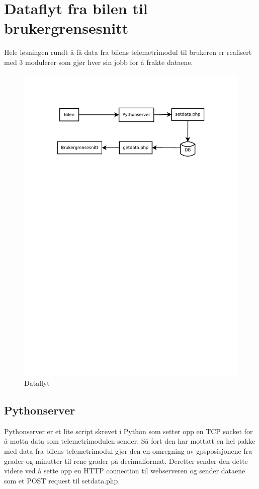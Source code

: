 \section{Dataflyt fra bilen til brukergrensesnitt}
Hele løsningen rundt å få data fra bilens telemetrimodul til brukeren er realisert med 3 modulerer som gjør hver sin jobb for å frakte dataene.
\begin{figure}[H]
\caption{Dataflyt} 
\label{dataflow}
\includegraphics[width=\textwidth, trim=0 550 0 75]{images/dataflow.pdf}
\end{figure}
\subsection{Pythonserver}
Pythonserver er et lite script skrevet i Python som setter opp en TCP socket for å motta data som telemetrimodulen sender. Så fort den har mottatt en hel pakke med data fra bilens telemetrimodul gjør den en omregning av gpsposisjonene fra grader og minutter til rene grader på decimalformat. Deretter sender den dette videre ved å sette opp en HTTP connection til webserveren og sender dataene som et POST request til setdata.php.

